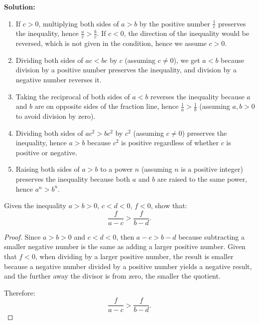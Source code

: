 \textbf{Solution:}

\begin{enumerate}
    \item If \( c > 0 \), multiplying both sides of \( a > b \) by the positive number \( \frac{1}{c} \) preserves the inequality, hence \( \frac{a}{c} > \frac{b}{c} \). If \( c < 0 \), the direction of the inequality would be reversed, which is not given in the condition, hence we assume \( c > 0 \).
    \item Dividing both sides of \( ac < bc \) by \( c \) (assuming \( c \neq 0 \)), we get \( a < b \) because division by a positive number preserves the inequality, and division by a negative number reverses it.
    \item Taking the reciprocal of both sides of \( a < b \) reverses the inequality because \( a \) and \( b \) are on opposite sides of the fraction line, hence \( \frac{1}{a} > \frac{1}{b} \) (assuming \( a, b > 0 \) to avoid division by zero).
    \item Dividing both sides of \( ac^2 > bc^2 \) by \( c^2 \) (assuming \( c \neq 0 \)) preserves the inequality, hence \( a > b \) because \( c^2 \) is positive regardless of whether \( c \) is positive or negative.
    \item Raising both sides of \( a > b \) to a power \( n \) (assuming \( n \) is a positive integer) preserves the inequality because both \( a \) and \( b \) are raised to the same power, hence \( a^n > b^n \).
\end{enumerate}
\begin{exercise}
    Given the inequality \( a > b > 0 \), \( c < d < 0 \), \( f < 0 \), show that:
\[
\frac{f}{a - c} > \frac{f}{b - d}.
\]
\end{exercise}
\begin{proof}
    Since \( a > b > 0 \) and \( c < d < 0 \), then \( a - c > b - d \) because subtracting a smaller negative number is the same as adding a larger positive number. Given that \( f < 0 \), when dividing by a larger positive number, the result is smaller because a negative number divided by a positive number yields a negative result, and the further away the divisor is from zero, the smaller the quotient.

Therefore:
\[
\frac{f}{a - c} > \frac{f}{b - d}.
\]
\end{proof}


